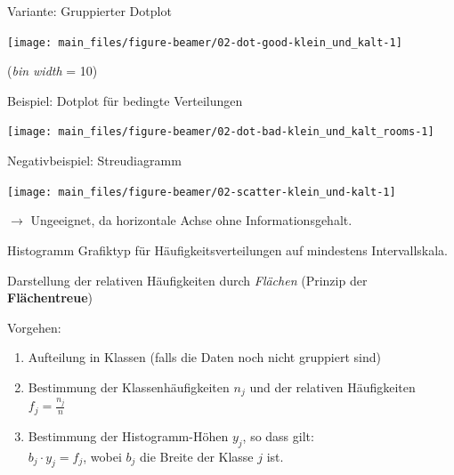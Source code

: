 \documentclass[
  10pt,
  ignorenonframetext,
]{beamer}
\providecommand{\tightlist}{%
  \setlength{\itemsep}{0pt}\setlength{\parskip}{0pt}}
\begin{document}
\begin{frame}{Variante: Gruppierter Dotplot}
\label{variante-gruppierter-dotplot}
\scriptsize

\begin{center}\texttt{[image: main\_files/figure-beamer/02-dot-good-klein\_und\_kalt-1]} \end{center}

\normalsize
\scriptsize

(\emph{bin width} = 10)
\end{frame}

\begin{frame}{Beispiel: Dotplot für bedingte Verteilungen}
\label{beispiel-dotplot-fuxfcr-bedingte-verteilungen}
\scriptsize

\begin{center}\texttt{[image: main\_files/figure-beamer/02-dot-bad-klein\_und\_kalt\_rooms-1]} \end{center}

\normalsize
\end{frame}

\begin{frame}{Negativbeispiel: Streudiagramm}
\label{negativbeispiel-streudiagramm}
\scriptsize

\begin{center}\texttt{[image: main\_files/figure-beamer/02-scatter-klein\_und-kalt-1]} \end{center}

\normalsize

\(\rightarrow\) Ungeeignet, da horizontale Achse ohne
Informationsgehalt.
\end{frame}

\begin{frame}{Histogramm}
\label{histogramm}
Grafiktyp für Häufigkeitsverteilungen auf mindestens Intervallskala.

Darstellung der relativen Häufigkeiten durch \emph{Flächen} (Prinzip der
\textbf{Flächentreue})

Vorgehen:

\begin{enumerate}
\tightlist
\item
  Aufteilung in Klassen (falls die Daten noch nicht gruppiert sind)
\item
  Bestimmung der Klassenhäufigkeiten \(n_j\) und der relativen
  Häufigkeiten \(f_j = \frac{n_j}{n}\)
\item
  Bestimmung der Histogramm-Höhen \(y_j\), so dass gilt:\\
  \(b_j \cdot y_j =  f_j\), wobei \(b_j\) die Breite der Klasse \(j\)
  ist.
\end{enumerate}
\end{frame}
\end{document}
